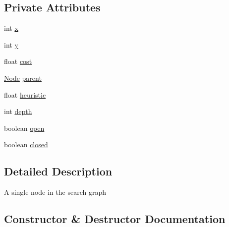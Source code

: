 \subsection*{Private Attributes}
\begin{DoxyCompactItemize}
\item 
int \mbox{\hyperlink{classorg_1_1newdawn_1_1slick_1_1util_1_1pathfinding_1_1_a_star_path_finder_1_1_node_ada4322ce47f95ba2707c0b1a03ea0f87}{x}}
\item 
int \mbox{\hyperlink{classorg_1_1newdawn_1_1slick_1_1util_1_1pathfinding_1_1_a_star_path_finder_1_1_node_a926a7542d89578d05ea59a6803479355}{y}}
\item 
float \mbox{\hyperlink{classorg_1_1newdawn_1_1slick_1_1util_1_1pathfinding_1_1_a_star_path_finder_1_1_node_afdb3132e5a155cb259db862e0a1ec018}{cost}}
\item 
\mbox{\hyperlink{classorg_1_1newdawn_1_1slick_1_1util_1_1pathfinding_1_1_a_star_path_finder_1_1_node}{Node}} \mbox{\hyperlink{classorg_1_1newdawn_1_1slick_1_1util_1_1pathfinding_1_1_a_star_path_finder_1_1_node_ade9fb25ef9f70ba6fded61359eb1fa81}{parent}}
\item 
float \mbox{\hyperlink{classorg_1_1newdawn_1_1slick_1_1util_1_1pathfinding_1_1_a_star_path_finder_1_1_node_aef05c5122f0a6a57b7daf3115b31bc3a}{heuristic}}
\item 
int \mbox{\hyperlink{classorg_1_1newdawn_1_1slick_1_1util_1_1pathfinding_1_1_a_star_path_finder_1_1_node_a71c1842ee82b0cd5cc3cf4c58c575034}{depth}}
\item 
boolean \mbox{\hyperlink{classorg_1_1newdawn_1_1slick_1_1util_1_1pathfinding_1_1_a_star_path_finder_1_1_node_abf28b5b61c313f5280b25d395d408c57}{open}}
\item 
boolean \mbox{\hyperlink{classorg_1_1newdawn_1_1slick_1_1util_1_1pathfinding_1_1_a_star_path_finder_1_1_node_a5fa6d77e8305e6028fdabdb8ad5cb00f}{closed}}
\end{DoxyCompactItemize}


\subsection{Detailed Description}
A single node in the search graph 

\subsection{Constructor \& Destructor Documentation}
\mbox{\label{classorg_1_1newdawn_1_1slick_1_1util_1_1pathfinding_1_1_a_star_path_finder_1_1_node_a4829984840f278579c342740b1cece78}} 
